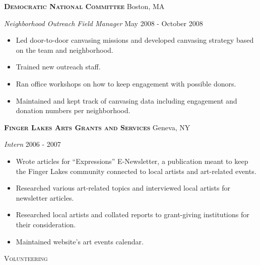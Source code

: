 \documentclass[a4paper]{article}
\newcommand{\lineunder} {
    \vspace*{-8pt} \\
    \hspace*{-18pt} \hrulefill \\
}
\newcommand{\header} [1] {
    {\hspace*{-18pt}\vspace*{6pt} \textsc{#1}}
    \vspace*{-6pt} \lineunder
    \vspace{2mm}
}
\begin{document}
\textbf{\textsc{Democratic National Committee}} \hfill Boston, MA\\
\vspace{2mm}

\begin{addmargin}[1em]{0em}

\textit{Neighborhood Outreach Field Manager} \hfill May 2008 - October 2008\\
\vspace{-1mm}
\begin{itemize} \itemsep 1pt
    \item Led door-to-door canvasing missions and developed canvasing strategy based on
        the team and neighborhood.
    \item Trained new outreach staff.
    \item Ran office workshops on how to keep engagement with possible
        donors.
    \item Maintained and kept track of canvasing data including engagement and donation
        numbers per neighborhood.
\end{itemize}

\end{addmargin}

\textbf{\textsc{Finger Lakes Arts Grants and Services}} \hfill Geneva, NY\\
\vspace{2mm}

\begin{addmargin}[1em]{0em}

\textit{Intern} \hfill 2006 - 2007\\
\vspace{-1mm}
\begin{itemize} \itemsep 1pt
    \item Wrote articles for “Expressions” E-Newsletter, a publication meant to keep the
        Finger Lakes community connected to local artists and art-related events.
    \item Researched various art-related topics and interviewed local artists for 
        newsletter articles.
    \item Researched local artists and collated reports to grant-giving institutions for
        their consideration.
    \item Maintained website's art events calendar. 
\end{itemize}
\end{addmargin}


\header{\faHeart \hspace{1pt} Volunteering}
\end{document}
